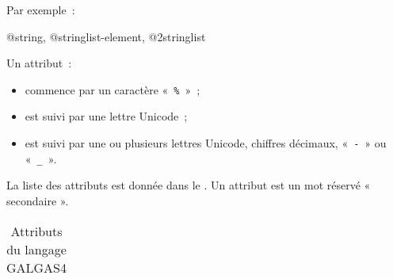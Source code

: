Par exemple~:
\begin{galgas4}
 @string, @stringlist-element, @2stringlist
\end{galgas4}






Un attribut~:
\begin{itemize}
  \item commence par un caractère «~\texttt{\%}~»~;
  \item est suivi par une lettre Unicode~;
  \item est suivi par une ou plusieurs lettres Unicode, chiffres décimaux, «~\texttt{-}~» ou «~\texttt{\_}~».
\end{itemize}

La liste des attributs est donnée dans le . Un attribut est un mot réservé « secondaire ».

\begin{table}[ht]
  \centering
  \begin{tabular}{llllllll}
    
  \end{tabular}
  \caption{Attributs du langage GALGAS4}
\end{table}



